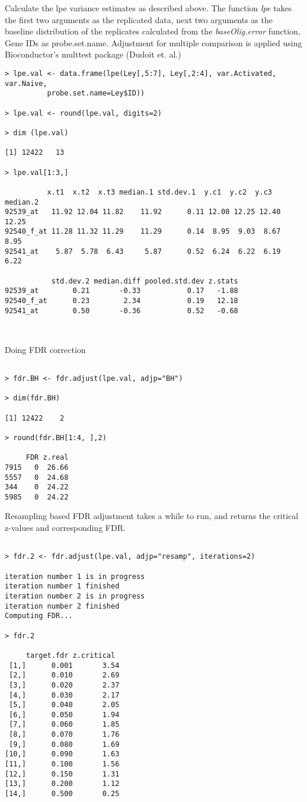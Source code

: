 \documentclass[12pt]{article}
\begin{document}
\noindent Calculate the lpe variance estimates as described above. The function {\it lpe} takes the first two arguments as the replicated data, next two arguments as the baseline distribution of the replicates calculated from the {\it baseOlig.error} function, Gene IDs as probe.set.name. Adjustment for multiple comparison is applied using Bioconductor's multtest package (Dudoit et. al.)

\begin{verbatim}
> lpe.val <- data.frame(lpe(Ley[,5:7], Ley[,2:4], var.Activated, var.Naive,
	      probe.set.name=Ley$ID))

> lpe.val <- round(lpe.val, digits=2)

> dim (lpe.val)

[1] 12422	13

> lpe.val[1:3,]

          x.t1  x.t2  x.t3 median.1 std.dev.1  y.c1  y.c2  y.c3 median.2
92539_at   11.92 12.04 11.82    11.92      0.11 12.00 12.25 12.40    12.25
92540_f_at 11.28 11.32 11.29    11.29      0.14  8.95  9.03  8.67     8.95
92541_at    5.87  5.78  6.43     5.87      0.52  6.24  6.22  6.19     6.22

           std.dev.2 median.diff pooled.std.dev z.stats
92539_at        0.21       -0.33           0.17   -1.88
92540_f_at      0.23        2.34           0.19   12.18
92541_at        0.50       -0.36           0.52   -0.68

  
\end{verbatim}

\noindent Doing FDR correction

\begin{verbatim}

> fdr.BH <- fdr.adjust(lpe.val, adjp="BH")

> dim(fdr.BH)

[1] 12422    2

> round(fdr.BH[1:4, ],2)

     FDR z.real
7915   0  26.66
5557   0  24.68
344    0  24.22
5985   0  24.22

\end{verbatim}

\noindent Resampling based FDR adjustment takes a while to run, and
returns the critical z-values and corresponding FDR. 

\begin{verbatim}

> fdr.2 <- fdr.adjust(lpe.val, adjp="resamp", iterations=2)

iteration number 1 is in progress
iteration number 1 finished
iteration number 2 is in progress
iteration number 2 finished
Computing FDR...

> fdr.2

     target.fdr z.critical
 [1,]      0.001       3.54
 [2,]      0.010       2.69
 [3,]      0.020       2.37
 [4,]      0.030       2.17
 [5,]      0.040       2.05
 [6,]      0.050       1.94
 [7,]      0.060       1.85
 [8,]      0.070       1.76
 [9,]      0.080       1.69
[10,]      0.090       1.63
[11,]      0.100       1.56
[12,]      0.150       1.31
[13,]      0.200       1.12
[14,]      0.500       0.25


\end{verbatim}
\end{document}

